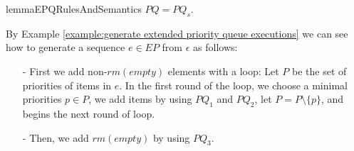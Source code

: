 \begin{restatable}{lemma}{EPQRulesAndSemantics}
\label{lemma:EPQ rules and semantics}
$\textit{PQ} = \textit{PQ}_s$.
\end{restatable}

By Example \ref{example:generate extended priority queue executions} we can see how to generate a sequence $e \in \textit{EP}$ from $\epsilon$ as follows:

\begin{itemize}
\setlength{\itemsep}{0.5pt}
\item[-] First we add non-$\textit{rm}(\textit{empty})$ elements with a loop: Let $P$ be the set of priorities of items in $e$. In the first round of the loop, we choose a minimal priorities $p \in P$, we add items by using $\textit{PQ}_1$ and $\textit{PQ}_2$, let $P = P \setminus \{p\}$, and begins the next round of loop.

\item[-] Then, we add $\textit{rm}(\textit{empty})$ by using $\textit{PQ}_3$.
\end{itemize}
